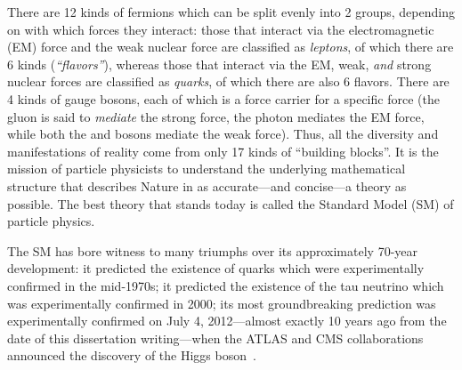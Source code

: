 There are 12 kinds of fermions which can be split evenly into 2 groups, depending on with which forces they interact:
those that interact via the electromagnetic (EM) force and the weak nuclear force are classified as \emph{leptons}, of which there are 6 kinds (\emph{``flavors''}),
whereas those that interact via the EM, weak, \emph{and} strong nuclear forces are classified as \emph{quarks}, of which there are also 6 flavors.
There are 4 kinds of gauge bosons, each of which is a force carrier for a specific force
(the gluon is said to \emph{mediate} the strong force, the photon mediates the EM force, while both the \PWpm and \PZ bosons mediate the weak force).
Thus, all the diversity and manifestations of reality come from only 17 kinds of ``building blocks''.
It is the mission of particle physicists to understand the underlying mathematical structure that describes Nature in as accurate---and concise---a theory as possible.
The best theory that stands today is called the Standard Model (SM) of particle physics.

The SM has bore witness to many triumphs over its approximately 70-year development:
it predicted the existence of quarks which were experimentally confirmed in the mid-1970s;
it predicted the existence of the tau neutrino which was experimentally confirmed in 2000;
its most groundbreaking prediction was experimentally confirmed on July 4, 2012---almost exactly 10 years ago from the date of this dissertation writing---when the ATLAS and CMS collaborations announced the discovery of the Higgs boson~\cite{chatrchyan_observation_2012, chatrchyan_observation_2013, aad_observation_2012}.


